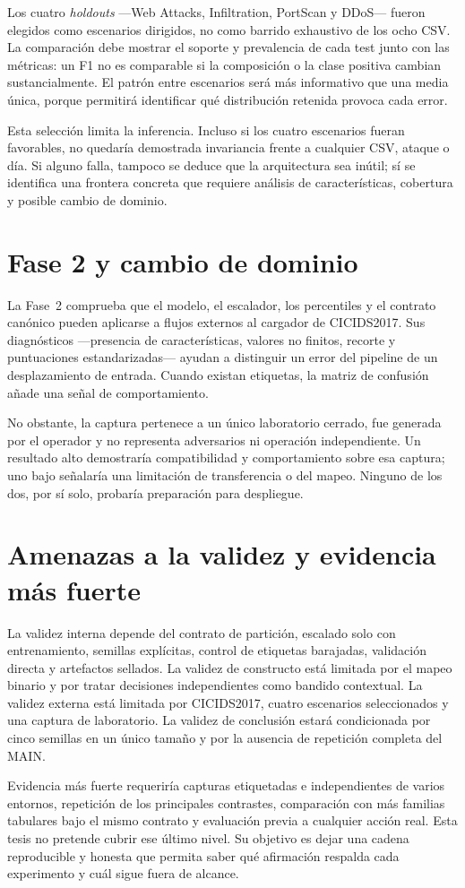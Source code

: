 Los cuatro \emph{holdouts} ---Web Attacks, Infiltration, PortScan y DDoS--- fueron elegidos como escenarios dirigidos, no como barrido exhaustivo de los ocho CSV. La comparación debe mostrar el soporte y prevalencia de cada test junto con las métricas: un F1 no es comparable si la composición o la clase positiva cambian sustancialmente. El patrón entre escenarios será más informativo que una media única, porque permitirá identificar qué distribución retenida provoca cada error.

Esta selección limita la inferencia. Incluso si los cuatro escenarios fueran favorables, no quedaría demostrada invariancia frente a cualquier CSV, ataque o día. Si alguno falla, tampoco se deduce que la arquitectura sea inútil; sí se identifica una frontera concreta que requiere análisis de características, cobertura y posible cambio de dominio.

\section{Fase 2 y cambio de dominio}

La Fase~2 comprueba que el modelo, el escalador, los percentiles y el contrato canónico pueden aplicarse a flujos externos al cargador de CICIDS2017. Sus diagnósticos ---presencia de características, valores no finitos, recorte y puntuaciones estandarizadas--- ayudan a distinguir un error del pipeline de un desplazamiento de entrada. Cuando existan etiquetas, la matriz de confusión añade una señal de comportamiento.

No obstante, la captura pertenece a un único laboratorio cerrado, fue generada por el operador y no representa adversarios ni operación independiente. Un resultado alto demostraría compatibilidad y comportamiento sobre esa captura; uno bajo señalaría una limitación de transferencia o del mapeo. Ninguno de los dos, por sí solo, probaría preparación para despliegue.

\section{Amenazas a la validez y evidencia más fuerte}

La validez interna depende del contrato de partición, escalado solo con entrenamiento, semillas explícitas, control de etiquetas barajadas, validación directa y artefactos sellados. La validez de constructo está limitada por el mapeo binario y por tratar decisiones independientes como bandido contextual. La validez externa está limitada por CICIDS2017, cuatro escenarios seleccionados y una captura de laboratorio. La validez de conclusión estará condicionada por cinco semillas en un único tamaño y por la ausencia de repetición completa del MAIN.

Evidencia más fuerte requeriría capturas etiquetadas e independientes de varios entornos, repetición de los principales contrastes, comparación con más familias tabulares bajo el mismo contrato y evaluación previa a cualquier acción real. Esta tesis no pretende cubrir ese último nivel. Su objetivo es dejar una cadena reproducible y honesta que permita saber qué afirmación respalda cada experimento y cuál sigue fuera de alcance.
